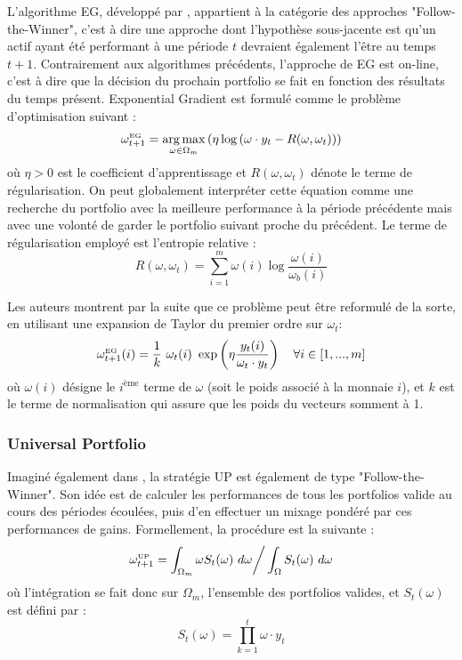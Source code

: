 \documentclass[a4paper, 10pt]{article}
\DeclareMathOperator*{\argmax}{arg\,max}
\begin{document}
L'algorithme EG, développé par \citet{Helmbold1998}, appartient à la catégorie des approches "Follow-the-Winner", c'est à dire une approche dont l'hypothèse sous-jacente est qu'un actif ayant été performant à une période $t$ devraient également l'être au temps $t+1$. Contrairement aux algorithmes précédents, l'approche de EG est on-line, c'est à dire que la décision du prochain portfolio se fait en fonction des résultats du temps présent. Exponential Gradient est formulé comme le problème d'optimisation suivant :
\begin{equation}
    \omega_{t+1}^{\text{\tiny EG}} = \argmax_{\omega \in \Omega_m} \left( \eta \log \left(\omega \cdot y_t - R(\omega, \omega_t) \right) \right)
\end{equation}
où $\eta > 0$ est le coefficient d'apprentissage et $R(\omega, \omega_t)$ dénote le terme de régularisation. On peut globalement interpréter cette équation comme une recherche du portfolio avec la meilleure performance à la période précédente mais avec une volonté de garder le portfolio suivant proche du précédent. Le terme de régularisation employé est l'entropie relative : 
\begin{equation}
    R(\omega, \omega_t) = \sum_{i=1}^{m} \omega(i) \log \frac{\omega(i)}{\omega_{b}(i)}
\end{equation}

Les auteurs montrent par la suite que ce problème peut être reformulé de la sorte, en utilisant une expansion de Taylor du premier ordre sur $\omega_t$:
\begin{equation}
    \omega_{t+1}^{\text{\tiny EG}}(i) = \frac{1}{k} \ \omega_{t}(i) \ \exp \left(\eta \frac{y_{t}(i)}{\omega_{t} \cdot y_t} \right) \quad \forall i \in [1, ..., m]
\end{equation}
où $\omega(i)$ désigne le $i^{\text{ème}}$ terme de $\omega$ (soit le poids associé à la monnaie $i$), et $k$ est le terme de normalisation qui assure que les poids du vecteurs somment à 1.

\subsubsection{Universal Portfolio}

Imaginé également dans \cite{Cover1991}, la stratégie UP est également de type "Follow-the-Winner". Son idée est de calculer les performances de tous les portfolios valide au cours des périodes écoulées, puis d'en effectuer un mixage pondéré par ces performances de gains. Formellement, la procédure est la suivante :
\begin{equation}
    \omega_{t+1}^{\text{\tiny UP}} = \int_{\Omega_m} \omega S_t(\omega) \ d\omega \bigg/ \int_{\Omega} S_t(\omega) \ d\omega
\end{equation}
où l'intégration se fait donc sur $\Omega_m$, l'ensemble des portfolios valides, et $S_t(\omega)$ est défini par :
\begin{equation}
    S_t(\omega) = \prod_{k=1}^{t} \omega \cdot y_t
\end{equation}
\end{document}
